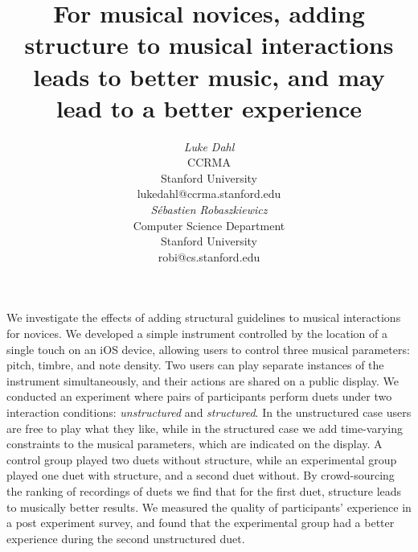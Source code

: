 \documentclass{article}
\begin{document}




\title{For musical novices, adding structure to musical interactions leads to better music, and may lead to a better experience}


\author{
\parbox[t]{9cm}{\centering
	     {\em Luke Dahl}\\
	     CCRMA\\
	     Stanford University\\
	     lukedahl@ccrma.stanford.edu}
\parbox[t]{9cm}{\centering
	     {\em S\'ebastien Robaszkiewicz}\\
	     Computer Science Department\\
	     Stanford University\\
	     robi@cs.stanford.edu}
}

\maketitle

\abstract
We investigate the effects of adding structural guidelines to musical interactions for novices. We developed a simple instrument controlled by the location of a single touch on an iOS device, allowing users to control three musical parameters: pitch, timbre, and note density.  Two users can play separate instances of the instrument simultaneously, and their actions are shared on a public display.  We conducted an experiment where pairs of participants perform duets under two interaction conditions: \emph{unstructured} and \emph{structured}.  In the unstructured case users are free to play what they like, while in the structured case we add time-varying constraints to the musical parameters, which are indicated on the display. A control group played two duets without structure, while an experimental group played one duet with structure, and a second duet without. By crowd-sourcing the ranking of recordings of duets we find that for the first duet, structure leads to musically better results. We measured the quality of participants' experience in a post experiment survey, and found that the experimental group had a better experience during the second unstructured duet.
\end{document}
